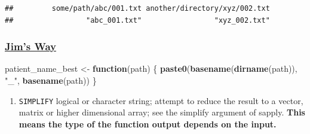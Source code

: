 \documentclass[]{book}
\newenvironment{Shaded}{\begin{snugshade}}{\end{snugshade}}
\newcommand{\CommentTok}[1]{\textcolor[rgb]{0.56,0.35,0.01}{\textit{#1}}}
\newcommand{\ControlFlowTok}[1]{\textcolor[rgb]{0.13,0.29,0.53}{\textbf{#1}}}
\newcommand{\DataTypeTok}[1]{\textcolor[rgb]{0.13,0.29,0.53}{#1}}
\newcommand{\DecValTok}[1]{\textcolor[rgb]{0.00,0.00,0.81}{#1}}
\newcommand{\KeywordTok}[1]{\textcolor[rgb]{0.13,0.29,0.53}{\textbf{#1}}}
\newcommand{\NormalTok}[1]{#1}
\newcommand{\OperatorTok}[1]{\textcolor[rgb]{0.81,0.36,0.00}{\textbf{#1}}}
\newcommand{\StringTok}[1]{\textcolor[rgb]{0.31,0.60,0.02}{#1}}
\providecommand{\tightlist}{%
  \setlength{\itemsep}{0pt}\setlength{\parskip}{0pt}}
\begin{document}
\begin{Shaded}
\end{Shaded}

\begin{verbatim}
##         some/path/abc/001.txt another/directory/xyz/002.txt 
##                 "abc_001.txt"                 "xyz_002.txt"
\end{verbatim}

\hypertarget{jims-way}{%
\subsubsection{\texorpdfstring{\href{https://www.jimhester.com/post/2018-04-12-vectorize/}{Jim's Way}}{Jim's Way}}\label{jims-way}}

\begin{Shaded}
\begin{Highlighting}[]
\NormalTok{patient_name_best <-}\StringTok{ }\ControlFlowTok{function}\NormalTok{(path) \{}
  \KeywordTok{paste0}\NormalTok{(}\KeywordTok{basename}\NormalTok{(}\KeywordTok{dirname}\NormalTok{(path)), }\StringTok{"_"}\NormalTok{, }\KeywordTok{basename}\NormalTok{(path))}
\NormalTok{\}}
\end{Highlighting}
\end{Shaded}

\begin{enumerate}
\def\labelenumi{\arabic{enumi}.}
\tightlist
\item
  \texttt{SIMPLIFY} logical or character string; attempt to reduce the result to a vector, matrix or higher dimensional array; see the simplify argument of sapply. \textbf{This means the type of the function output depends on the input.}
\end{enumerate}
\end{document}
